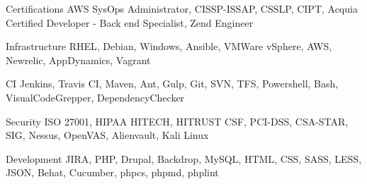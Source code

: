 


\begin{cvskills}


\cvskill
{Certifications}
{AWS SysOps Administrator, CISSP-ISSAP, CSSLP, CIPT, Acquia Certified Developer - Back end Specialist, Zend Engineer }

\cvskill
{Infrastructure}
{RHEL, Debian, Windows, Ansible, VMWare vSphere, AWS, Newrelic, AppDynamics, Vagrant }

\cvskill
{CI}
{Jenkins, Travis CI, Maven, Ant, Gulp, Git, SVN, TFS, Powershell, Bash, VisualCodeGrepper, DependencyChecker }

\cvskill
{Security}
{ISO 27001, HIPAA HITECH, HITRUST CSF, PCI-DSS, CSA-STAR, SIG, Nessus, OpenVAS, Alienvault, Kali Linux }

\cvskill
{Development}
{JIRA, PHP, Drupal, Backdrop, MySQL, HTML, CSS, SASS, LESS, JSON, Behat, Cucumber, phpcs, phpmd, phplint }




\end{cvskills}
